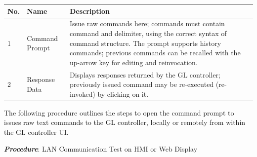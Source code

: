 \begin{longtable}[]{@{}lll@{}}
\toprule
\begin{minipage}[b]{0.04\columnwidth}\raggedright
No.\strut
\end{minipage} & \begin{minipage}[b]{0.23\columnwidth}\raggedright
Name\strut
\end{minipage} & \begin{minipage}[b]{0.65\columnwidth}\raggedright
Description\strut
\end{minipage}\tabularnewline
\midrule
\endhead
\begin{minipage}[t]{0.04\columnwidth}\raggedright
1\strut
\end{minipage} & \begin{minipage}[t]{0.23\columnwidth}\raggedright
Command Prompt\strut
\end{minipage} & \begin{minipage}[t]{0.65\columnwidth}\raggedright
Issue raw commands here; commands must contain command and delimiter,
using the correct syntax of command structure. The prompt supports
history commands; previous commands can be recalled with the up-arrow
key for editing and reinvocation.\strut
\end{minipage}\tabularnewline
\begin{minipage}[t]{0.04\columnwidth}\raggedright
2\strut
\end{minipage} & \begin{minipage}[t]{0.23\columnwidth}\raggedright
Response Data\strut
\end{minipage} & \begin{minipage}[t]{0.65\columnwidth}\raggedright
Displays responses returned by the GL controller; previously issued
command may be re-executed (re-invoked) by clicking on it.\strut
\end{minipage}\tabularnewline
\bottomrule
\end{longtable}

The following procedure outlines the steps to open the command prompt to
issues raw text commands to the GL controller, locally or remotely from
within the GL controller UI.

\textbf{\emph{Procedure}}: LAN Communication Test on HMI or Web Display

